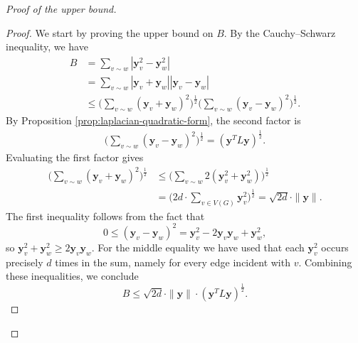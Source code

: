 \begin{proof}[Proof of the upper bound]
\begin{proof}
        We start by proving the upper bound on $B$. 
        By the Cauchy--Schwarz inequality, we have
        \begin{align*}
            B &= \sum \limits_{v \sim w} | \bm{y}_v^2 - \bm{y}_w^2 | \\
                &= \sum \limits_{v \sim w} |\bm{y}_v + \bm{y}_w| | \bm{y}_v - \bm{y}_w|  \\ 
                &\le \Bigg( \sum \limits_{v \sim w} (\bm{y}_v + \bm{y}_w)^2 \Bigg)^{\frac{1}{2}}  \Bigg( \sum \limits_{v \sim w} (\bm{y}_v - \bm{y}_w)^2 \Bigg)^{\frac{1}{2}} .
        \end{align*}
        By Proposition \ref{prop:laplacian-quadratic-form}, the second factor is
        \begin{align*}
            \Bigg ( \sum \limits_{v \sim w} (\bm{y}_v - \bm{y}_w)^2 \Bigg)^{\frac{1}{2}} = (\bm{y}^T L \bm{y})^{\frac{1}{2}}.
        \end{align*}
        Evaluating the first factor gives
        \begin{align*}
            \Bigg( \sum \limits_{v \sim w} (\bm{y}_v + \bm{y}_w)^2 \Bigg)^{\frac{1}{2}} &\le \Bigg( \sum \limits_{v \sim w} 2 (\bm{y}_v^2 + \bm{y}_w^2) \Bigg)^{\frac{1}{2}} \\
                &= \Bigg( 2d \cdot \sum \limits_{v \in V(G)} \bm{y}_v^2 \Bigg)^{\frac{1}{2}} = \sqrt{2d} \cdot \| \bm{y} \|.
        \end{align*}
        The first inequality follows from the fact that  
        \begin{equation*}
            0 \le (\bm{y}_v - \bm{y}_w)^2 = \bm{y}_v^2 - 2 \bm{y}_v \bm{y}_w + \bm{y}_w^2,
        \end{equation*}
        so $\bm{y}_v^2 + \bm{y}_w^2 \ge 2 \bm{y}_v \bm{y}_w$.
        For the middle equality we have used that each $\bm{y}_v^2$ occurs precisely $d$ times in the sum, namely for every edge incident with $v$.
        Combining these inequalities, we conclude 
        \begin{equation*}
             B \le \sqrt{2d} \cdot \|\bm{y} \|  \cdot (\bm{y}^T L \bm{y})^{\frac{1}{2}}.
        \end{equation*}


\end{proof}
\end{proof}
